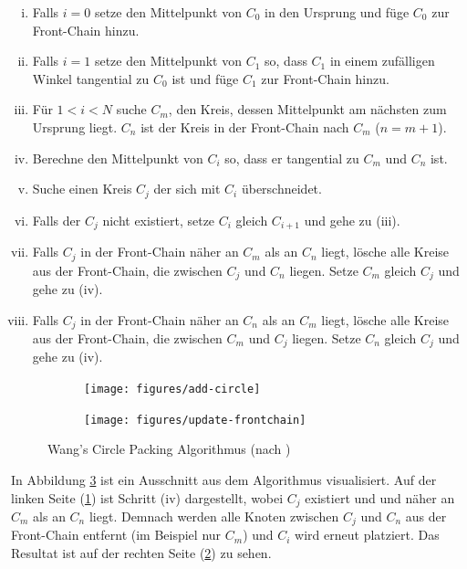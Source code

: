 \begin{enumerate}[(i), labelindent=0pt, align=left, itemsep=0pt, parsep=0pt, labelsep=.5em, leftmargin=!]
  \item Falls $i = 0$ setze den Mittelpunkt von $C_0$ in den Ursprung und füge $C_0$ zur Front-Chain hinzu.
  \item Falls $i = 1$ setze den Mittelpunkt von $C_1$ so, dass $C_1$ in einem zufälligen Winkel tangential zu $C_0$ ist und füge $C_1$ zur Front-Chain hinzu.
  \item Für $1 < i < N$ suche $C_m$, den Kreis, dessen Mittelpunkt am nächsten zum Ursprung liegt. $C_n$ ist der Kreis in der Front-Chain nach $C_m$ ($n=m+1$).
  \item Berechne den Mittelpunkt von $C_i$ so, dass er tangential zu $C_m$ und $C_n$ ist.
  \item Suche einen Kreis $C_j$ der sich mit $C_i$ überschneidet.
  \item Falls der $C_j$ nicht existiert, setze $C_i$ gleich $C_{i+1}$ und gehe zu (iii).
  \item Falls $C_j$ in der Front-Chain näher an $C_m$ als an $C_n$ liegt, lösche alle Kreise aus der Front-Chain, die zwischen $C_j$ und $C_n$ liegen. Setze $C_m$ gleich $C_j$ und gehe zu (iv).
  \item Falls $C_j$ in der Front-Chain näher an $C_n$ als an $C_m$ liegt, lösche alle Kreise aus der Front-Chain, die zwischen $C_m$ und $C_j$ liegen. Setze $C_n$ gleich $C_j$ und gehe zu (iv).
\end{enumerate}

\label{subsec:collision}\setlength{\fwidth}{.4\textwidth}
\begin{figure}[htb]
  \captionsetup{justification=centering}
  \begin{subfigure}[t]{\fwidth}
   \texttt{[image: figures/add-circle]}
    \label{fig:add-circle}
  \end{subfigure}
  \hspace{1cm}
  \begin{subfigure}[t]{\fwidth}
  	\texttt{[image: figures/update-frontchain]}
  	 \label{fig:update-frontchain}
  \end{subfigure}
  \caption{Wang's Circle Packing Algorithmus (nach \cite{bostock2017abetter})}
  \label{fig:circle-packing}
\end{figure}

In Abbildung \ref{fig:circle-packing} ist ein Ausschnitt aus dem Algorithmus visualisiert. Auf der linken Seite (\ref{fig:add-circle}) ist Schritt (iv) dargestellt, wobei $C_j$ existiert und und näher an $C_m$ als an $C_n$ liegt. Demnach werden alle Knoten zwischen $C_j$ und $C_n$ aus der Front-Chain entfernt (im Beispiel nur $C_m$) und $C_i$ wird erneut platziert. Das Resultat ist auf der rechten Seite (\ref{fig:update-frontchain}) zu sehen.


